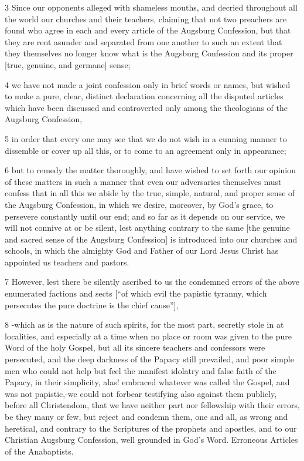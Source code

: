 {3 Since our opponents alleged with shameless mouths, and decried throughout all the world our churches and their teachers, claiming that not two preachers are found who agree in each and every article of the Augsburg Confession, but that they are rent asunder and separated from one another to such an extent that they themselves no longer know what is the Augsburg Confession and its proper [true, genuine, and germane] sense;

4 we have not made a joint confession only in brief words or names, but wished to make a pure, clear, distinct declaration concerning all the disputed articles which have been discussed and controverted only among the theologians of the Augsburg Confession,

5 in order that every one may see that we do not wish in a cunning manner to dissemble or cover up all this, or to come to an agreement only in appearance;

6 but to remedy the matter thoroughly, and have wished to set forth our opinion of these matters in such a manner that even our adversaries themselves must confess that in all this we abide by the true, simple, natural, and proper sense of the Augsburg Confession, in which we desire, moreover, by God’s grace, to persevere constantly until our end; and so far as it depends on our service, we will not connive at or be silent, lest anything contrary to the same [the genuine and sacred sense of the Augsburg Confession] is introduced into our churches and schools, in which the almighty God and Father of our Lord Jesus Christ has appointed us teachers and pastors.

7 However, lest there be silently ascribed to us the condemned errors of the above enumerated factions and sects [“of which evil the papistic tyranny, which persecutes the pure doctrine is the chief cause”],

8 -which as is the nature of such spirits, for the most part, secretly stole in at localities, and especially at a time when no place or room was given to the pure Word of the holy Gospel, but all its sincere teachers and confessors were persecuted, and the deep darkness of the Papacy still prevailed, and poor simple men who could not help but feel the manifest idolatry and false faith of the Papacy, in their simplicity, alas! embraced whatever was called the Gospel, and was not papistic,-we could not forbear testifying also against them publicly, before all Christendom, that we have neither part nor fellowship with their errors, be they many or few, but reject and condemn them, one and all, as wrong and heretical, and contrary to the Scriptures of the prophets and apostles, and to our Christian Augsburg Confession, well grounded in God’s Word.
Erroneous Articles of the Anabaptists.

}
